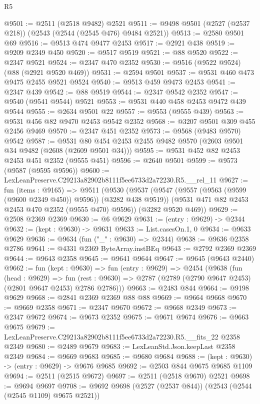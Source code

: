 \begin{lexlean}{R5}
\begin{coremodule}
@9501 := @2511 (@2518 @9482) @2521
@9511 := @9498 @9501 (@2527 (@2537 @218)) (@2543 (@2544 (@2545 @476) @9484 @2521))
@9513 := @2580 @9501 @69
@9516 := @9513 @474 @9477 @2453
@9517 := @2921 @438
@9519 := @9209 @2349 @450
@9520 := @9517 @9519
@9521 := @88 @9520
@9522 := @2347 @9521
@9524 := @2347 @470 @2352
@9530 := @9516 (@9522 @9524) (@88 (@2921 @9520 @469))
@9531 := @2594 @9501
@9537 := @9531 @460 @473 @9475 @2455 @9521 @9524
@9540 := @9513 @459 @9473 @2453
@9541 := @2347 @439
@9542 := @88 @9519
@9544 := @2347 @9542 @2352
@9547 := @9540 (@9541 @9544) @9521
@9553 := @9531 @440 @458 @2453 @9472 @439 @9544
@9555 := @2634 @9501 @22
@9557 := @9553 (@9555 @439)
@9563 := @9531 @456 @82 @9470 @2453 @9542 @2352
@9568 := @3207 @9501 @309 @455 @2456 @9469
@9570 := @2347 @451 @2352
@9573 := @9568 (@9483 @9570) @9542
@9587 := @9531 @80 @454 @2453 @2455 @9482 @9570 (@2603 @9501 @34 @9482 (@2608 (@2609 @9501 @34)))
@9595 := @9531 @452 @82 @2453 @2453 @451 @2352 (@9555 @451)
@9596 := @2640 @9501
@9599 := @9573 (@9587 (@9595 @9596))
@9600 := LexLeanPreserve.C29213a82902b8111f5ee6733d2a72230.R5.__rel_11
@9627 := fun (items : @9165) =>
  @9511
    (@9530
      (@9537
        (@9547 (@9557 (@9563 (@9599 (@9600 @2349 @450)) @9596)) (@3282 @438 @9519))
        (@9531 @471 @82 @2453 @2453 @470 @2352 (@9555 @470) @9596))
      (@3282 @9520 @469))
@9629 := @2508 @2369 @2369
@9630 := @6 @9629
@9631 := (entry : @9629) -> @2344
@9632 := (kept : @9630) -> @9631
@9633 := List.casesOn.{1, 0}
@9634 := @9633 @9629
@9636 := @9634 (fun ("_" : @9630) => @2344)
@9638 := @9636 @2358 @2786
@9641 := @4331 @2369 ByteArray.instBEq
@9643 := @2792 @2369 @2369
@9644 := @9643 @2358
@9645 := @9641 @9644
@9647 := @9645 (@9643 @2440)
@9662 := fun (kept : @9630) =>
  fun (entry : @9629) =>
  @2454
    (@9638
      (fun (head : @9629) =>
      fun (rest : @9630) => @2787 (@2789 (@2790 @9647 @2453) (@2801 @9647 @2453) @2786 @2786)))
@9663 := @2483 @844
@9664 := @9198 @9629
@9668 := @2841 @2369 @2369 @88 @88
@9669 := @9664 @9668
@9670 := @9669 @2358
@9671 := @2347 @9670
@9672 := @9668 @2349
@9673 := @2347 @9672
@9674 := @9673 @2352
@9675 := @9671 @9674
@9676 := @9663 @9675
@9679 := LexLeanPreserve.C29213a82902b8111f5ee6733d2a72230.R5.__fits_22 @2358 @2349
@9680 := @2489 @9679
@9683 := LexLeanStd.Json.keepLast @2358 @2349
@9684 := @9669 @9683
@9685 := @9680 @9684
@9688 := (kept : @9630) -> (entry : @9629) -> @9676 @9685
@9692 := @2503 @844 @9675 @9685 @1109
@9694 := @2511 (@2515 @9672)
@9697 := @2511 (@2518 @9670) @2521
@9698 := @9694 @9697
@9708 := @9692 @9698 (@2527 (@2537 @844)) (@2543 (@2544 (@2545 @1109) @9675 @2521))

\end{coremodule}
\end{lexlean}
